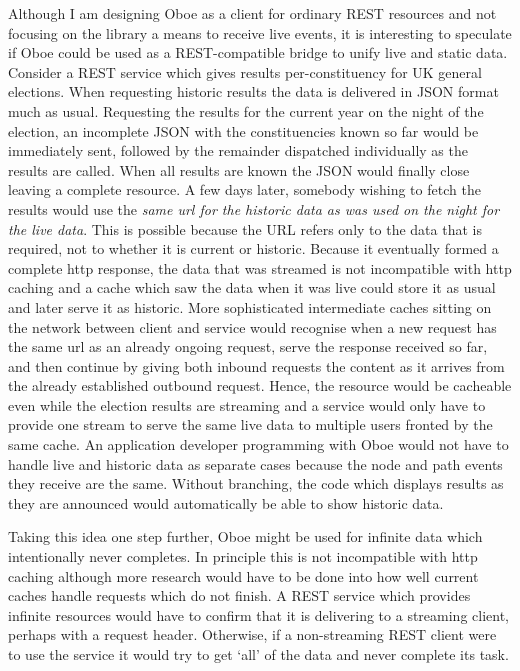 \documentclass[12pt, ]{article}
\begin{document}
Although I am designing Oboe as a client for ordinary REST resources and
not focusing on the library a means to receive live events, it is
interesting to speculate if Oboe could be used as a REST-compatible
bridge to unify live and static data. Consider a REST service which
gives results per-constituency for UK general elections. When requesting
historic results the data is delivered in JSON format much as usual.
Requesting the results for the current year on the night of the
election, an incomplete JSON with the constituencies known so far would
be immediately sent, followed by the remainder dispatched individually
as the results are called. When all results are known the JSON would
finally close leaving a complete resource. A few days later, somebody
wishing to fetch the results would use the \emph{same url for the
historic data as was used on the night for the live data}. This is
possible because the URL refers only to the data that is required, not
to whether it is current or historic. Because it eventually formed a
complete http response, the data that was streamed is not incompatible
with http caching and a cache which saw the data when it was live could
store it as usual and later serve it as historic. More sophisticated
intermediate caches sitting on the network between client and service
would recognise when a new request has the same url as an already
ongoing request, serve the response received so far, and then continue
by giving both inbound requests the content as it arrives from the
already established outbound request. Hence, the resource would be
cacheable even while the election results are streaming and a service
would only have to provide one stream to serve the same live data to
multiple users fronted by the same cache. An application developer
programming with Oboe would not have to handle live and historic data as
separate cases because the node and path events they receive are the
same. Without branching, the code which displays results as they are
announced would automatically be able to show historic data.

Taking this idea one step further, Oboe might be used for infinite data
which intentionally never completes. In principle this is not
incompatible with http caching although more research would have to be
done into how well current caches handle requests which do not finish. A
REST service which provides infinite resources would have to confirm
that it is delivering to a streaming client, perhaps with a request
header. Otherwise, if a non-streaming REST client were to use the
service it would try to get `all' of the data and never complete its
task.
\end{document}
